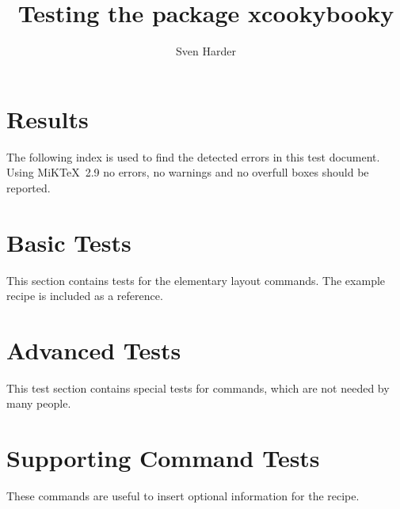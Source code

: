\documentclass[%
a4paper,
11pt
]{article}
\title{Testing the package xcookybooky}
\author{Sven Harder}
\begin{document}




\section{Results}
The following index is used to find the detected errors in this test document. Using MiKTeX~2.9 no errors, no warnings and no overfull boxes should be reported.
\printindex



\section{Basic Tests}
This section contains tests for the elementary layout commands. The example recipe is included as a reference.






















\section{Advanced Tests}
This test section contains special tests for commands, which are not needed by many people.







\section{Supporting Command Tests}
These commands are useful to insert optional information for the recipe.
\end{document}
